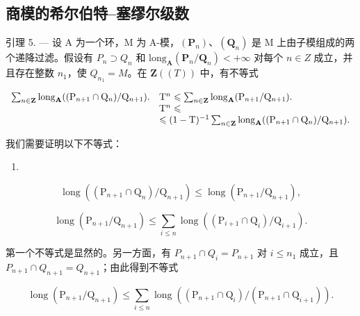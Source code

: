 \subsection{商模的希尔伯特–塞缪尔级数}

引理 5. — 设 A 为一个环，M 为 A-模，\((\mathbf{P}_{n})\)、\((\mathbf{Q}_{n})\) 是 M 上由子模组成的两个递降过滤。假设有 \(P_{n} \supset Q_{n}\) 和 \(\text{long}_{\mathbf{A}}(\mathbf{P}_{n}/\mathbf{Q}_{n}) < +\infty\) 对每个 \(n \in Z\) 成立，并且存在整数 \(n_{1}\)，使 \(Q_{n_{1}} = M\)。在 \(\mathbf{Z}((T))\) 中，有不等式

\[
\begin{array}{r l} \sum_ {n \in \mathbf {Z}} \mathrm{long} _ {\mathbf {A}} ((\mathrm{P} _ {n + 1} \cap \mathrm{Q} _ {n}) / \mathrm{Q} _ {n + 1}). & \mathrm{T} ^ {n} \leqslant \sum_ {n \in \mathbf {Z}} \mathrm{long} _ {\mathbf {A}} (\mathrm{P} _ {n + 1} / \mathrm{Q} _ {n + 1}). \\ & \mathrm{T} ^ {n} \leqslant \\ & \leqslant (1 - \mathrm{T}) ^ {- 1} \sum_ {n \in \mathbf {Z}} \mathrm{long} _ {\mathbf {A}} ((\mathrm{P} _ {n + 1} \cap \mathrm{Q} _ {n}) / \mathrm{Q} _ {n + 1}). \end{array}
\]

我们需要证明以下不等式：

\begin{enumerate}
\def\labelenumi{(\arabic{enumi})}
\setcounter{enumi}{14}
\tightlist
\item
\end{enumerate}

\[
\operatorname{long} \left(\left(\mathrm{P} _ {n + 1} \cap \mathrm{Q} _ {n}\right) / \mathrm{Q} _ {n + 1}\right) \leqslant \operatorname{long} \left(\mathrm{P} _ {n + 1} / \mathrm{Q} _ {n + 1}\right),\tag{16}
\]

\[
\operatorname{long} \left(\mathrm{P} _ {n + 1} / \mathrm{Q} _ {n + 1}\right) \leqslant \sum_ {i \leqslant n} \operatorname{long} \left(\left(\mathrm{P} _ {i + 1} \cap \mathrm{Q} _ {i}\right) / \mathrm{Q} _ {i + 1}\right).
\]

第一个不等式是显然的。另一方面，有 \(P_{n+1} \cap Q_i = P_{n+1}\) 对 \(i \leqslant n_1\) 成立，且 \(P_{n+1} \cap Q_{n+1} = Q_{n+1}\)；由此得到不等式

\[
\operatorname{long} \left(\mathrm{P} _ {n + 1} / \mathrm{Q} _ {n + 1}\right) \leqslant \sum_ {i \leqslant n} \operatorname{long} \left(\left(\mathrm{P} _ {n + 1} \cap \mathrm{Q} _ {i}\right) / \left(\mathrm{P} _ {n + 1} \cap \mathrm{Q} _ {i + 1}\right)\right).
\]

